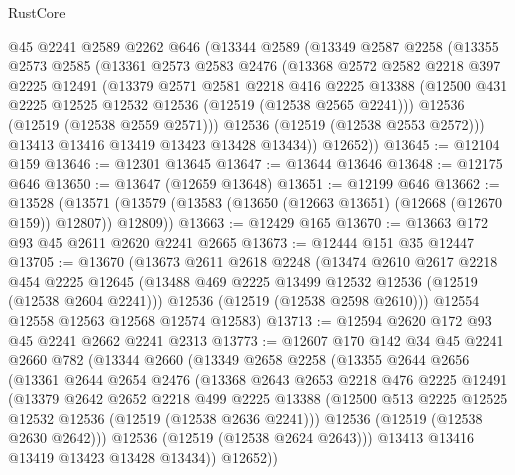 \begin{lexlean}{RustCore}
\begin{coremodule}
    @45
    @2241
    @2589
    @2262
    @646
    (@13344
      @2589
      (@13349
        @2587
        @2258
        (@13355
          @2573
          @2585
          (@13361
            @2573
            @2583
            @2476
            (@13368
              @2572
              @2582
              @2218
              @397
              @2225
              @12491
              (@13379
                @2571
                @2581
                @2218
                @416
                @2225
                @13388
                (@12500 @431 @2225 @12525 @12532 @12536 (@12519 (@12538 @2565 @2241)))
                @12536
                (@12519 (@12538 @2559 @2571)))
              @12536
              (@12519 (@12538 @2553 @2572)))
            @13413
            @13416
            @13419
            @13423
            @13428
            @13434))
        @12652))
@13645 := @12104 @159
@13646 := @12301 @13645
@13647 := @13644 @13646
@13648 := @12175 @646
@13650 := @13647 (@12659 @13648)
@13651 := @12199 @646
@13662 := @13528
    (@13571 (@13579 (@13583 (@13650 (@12663 @13651) (@12668 (@12670 @159)) @12807)) @12809))
@13663 := @12429 @165
@13670 := @13663 @172 @93 @45 @2611 @2620 @2241 @2665
@13673 := @12444 @151 @35 @12447
@13705 := @13670
    (@13673
      @2611
      @2618
      @2248
      (@13474
        @2610
        @2617
        @2218
        @454
        @2225
        @12645
        (@13488 @469 @2225 @13499 @12532 @12536 (@12519 (@12538 @2604 @2241)))
        @12536
        (@12519 (@12538 @2598 @2610)))
      @12554
      @12558
      @12563
      @12568
      @12574
      @12583)
@13713 := @12594 @2620 @172 @93 @45 @2241 @2662 @2241 @2313
@13773 := @12607
    @170
    @142
    @34
    @45
    @2241
    @2660
    @782
    (@13344
      @2660
      (@13349
        @2658
        @2258
        (@13355
          @2644
          @2656
          (@13361
            @2644
            @2654
            @2476
            (@13368
              @2643
              @2653
              @2218
              @476
              @2225
              @12491
              (@13379
                @2642
                @2652
                @2218
                @499
                @2225
                @13388
                (@12500 @513 @2225 @12525 @12532 @12536 (@12519 (@12538 @2636 @2241)))
                @12536
                (@12519 (@12538 @2630 @2642)))
              @12536
              (@12519 (@12538 @2624 @2643)))
            @13413
            @13416
            @13419
            @13423
            @13428
            @13434))
        @12652))

\end{coremodule}
\end{lexlean}
